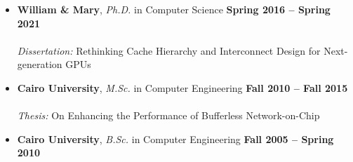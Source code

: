 \documentclass[10pt,a4]{article}
\begin{document}
\begin{itemize}

\item{\bf William \& Mary}, {\it Ph.D.} in Computer Science \hfill {\bf Spring 2016 -- Spring 2021} \\
\vspace{-0.3cm}\\
{\it Dissertation:} Rethinking Cache Hierarchy and Interconnect Design for Next-generation GPUs 

\item{\bf Cairo University}, {\it M.Sc.} in Computer Engineering \hfill {\bf Fall 2010 -- Fall 2015} \\
\vspace{-0.3cm}\\
{\it Thesis:} On Enhancing the Performance of Bufferless Network-on-Chip 

\item{\bf Cairo University}, {\it B.Sc.} in Computer Engineering \hfill {\bf Fall 2005 -- Spring 2010} 

\end{itemize}
\end{document}
